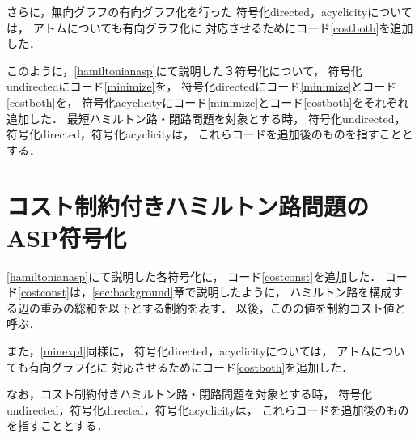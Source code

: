 
さらに，無向グラフの有向グラフ化を行った
符号化directed，acyclicityについては，
アトムについても有向グラフ化に
対応させるためにコード\ref{costboth}を追加した．

このように，\ref{hamiltonianasp}にて説明した３符号化について，
符号化undirectedにコード\ref{minimize}を，
符号化directedにコード\ref{minimize}とコード\ref{costboth}を，
符号化acyclicityにコード\ref{minimize}とコード\ref{costboth}をそれぞれ追加した．
最短ハミルトン路・閉路問題を対象とする時，
符号化undirected，符号化directed，符号化acyclicityは，
これらコードを追加後のものを指すこととする．
\section{コスト制約付きハミルトン路問題のASP符号化}

\ref{hamiltonianasp}にて説明した各符号化に，
コード\ref{costconst}を追加した．
コード\ref{costconst}は，\ref{sec:background}章で説明したように，
ハミルトン路を構成する辺の重みの総和を以下とする制約を表す．
以後，このの値を制約コスト値と呼ぶ．

また，\ref{minexpl}同様に，
符号化directed，acyclicityについては，
アトムについても有向グラフ化に
対応させるためにコード\ref{costboth}を追加した．

なお，コスト制約付きハミルトン路・閉路問題を対象とする時，
符号化undirected，符号化directed，符号化acyclicityは，
これらコードを追加後のものを指すこととする．
